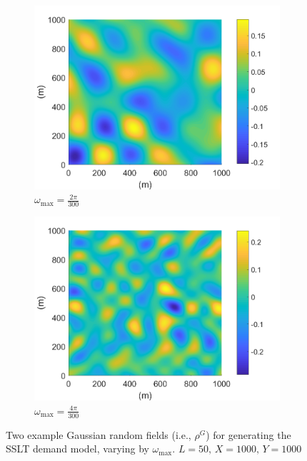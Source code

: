 \documentclass[12pt,dvipsnames]{report}
\begin{document}
\begin{figure}[!ht]
\centering
\begin{subfigure}{.45\textwidth}
	\centering
	\includegraphics[width=1\linewidth]{rhoG_O2pi-300_L50_X1000_Y1000}
	\caption{\small $\omega_{\max}=\frac{2\pi}{300}$}
	\label{fig:rhoG_2pi-300}
\end{subfigure}
\hspace{0.5cm}
\begin{subfigure}{.45\textwidth}
	\centering
	\includegraphics[width=1\linewidth]{rhoG_O4pi-300_L50_X1000_Y1000}
	\caption{\small $\omega_{\max}=\frac{4\pi}{300}$}
	\label{fig:rhoG_4pi-300}
\end{subfigure}
\caption[Example Gaussian random fields for SSLT demand model generation]{\small Two example Gaussian random fields (i.e., $\rho^G$) for generating the SSLT demand model, varying by $\omega_{\max}$.  $L = 50,\, X = 1000,\, Y = 1000$}
\label{fig:rhoG}
\end{figure}
\end{document}
